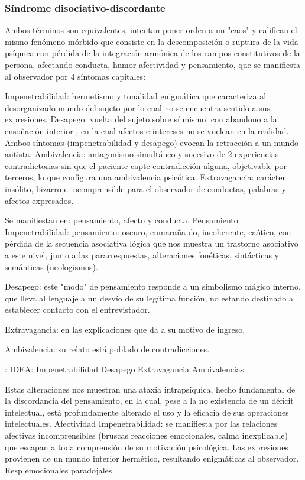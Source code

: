 \subsubsection*{Síndrome disociativo-discordante}
Ambos términos son equivalentes, intentan poner orden a un "caos" y califican el mismo fenómeno mórbido que consiste en la descomposición o ruptura de la vida psíquica con pérdida de la integración armónica de los campos constitutivos de la persona, afectando conducta, humor-afectividad y pensamiento, que se manifiesta al observador por 4 síntomas capitales:

Impenetrabilidad: hermetismo y tonalidad enigmática que caracteriza al desorganizado mundo del sujeto por lo cual no se encuentra sentido a sus expresiones. Desapego: vuelta del sujeto sobre sí mismo, con abandono a la ensoñación interior , en la cual afectos e intereses no se vuelcan en la realidad. Ambos síntomas (impenetrabilidad y desapego) evocan la retracción a un mundo autista. Ambivalencia: antagonismo simultáneo y sucesivo de 2 experiencias contradictorias sin que el paciente capte contradicción alguna, objetivable por terceros, lo que configura una ambivalencia psicótica. Extravagancia: carácter insólito, bizarro e incomprensible para el observador de conductas, palabras y afectos expresados.

Se manifiestan en: pensamiento, afecto y conducta. Pensamiento Impenetrabilidad: pensamiento: oscuro, enmaraña-do, incoherente, caótico, con pérdida de la secuencia asociativa lógica que nos muestra un trastorno asociativo a este nivel, junto a las pararrespuestas, alteraciones fonéticas, sintácticas y semánticas (neologismos).

Desapego: este "modo" de pensamiento responde a un simbolismo mágico interno, que lleva al lenguaje a un desvío de su legítima función, no estando destinado a establecer contacto con el entrevistador.

Extravagancia: en las explicaciones que da a su motivo de ingreso.

Ambivalencia: su relato está poblado de contradicciones.

\faLightbulb: IDEA: Impenetrabilidad Desapego Extravagancia Ambivalencias

Estas alteraciones nos muestran una ataxia intrapsíquica, hecho fundamental de la discordancia del pensamiento, en la cual, pese a la no existencia de un déficit intelectual, está profundamente alterado el uso y la eficacia de sus operaciones intelectuales. Afectividad Impenetrabilidad: se manifiesta por las relaciones afectivas incomprensibles (bruscas reacciones emocionales, calma inexplicable) que escapan a toda comprensión de su motivación psicológica. Las expresiones provienen de un mundo interior hermético, resultando enigmáticas al observador. Resp emocionales paradojales

